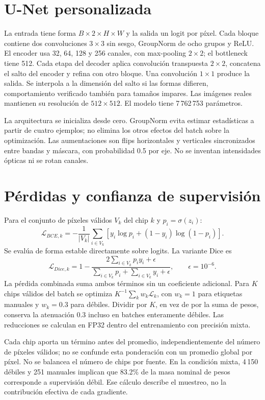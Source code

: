 \section{U-Net personalizada}
La entrada tiene forma $B\times2\times H\times W$ y la salida un logit por píxel.
Cada bloque contiene dos convoluciones $3\times3$ sin sesgo, GroupNorm de ocho grupos
y ReLU. El encoder usa 32, 64, 128 y 256 canales, con max-pooling $2\times2$;
el bottleneck tiene 512. Cada etapa del decoder aplica convolución transpuesta
$2\times2$, concatena el salto del encoder y refina con otro bloque. Una convolución
$1\times1$ produce la salida. Se interpola a la dimensión del salto si las formas
difieren, comportamiento verificado también para tamaños impares. Las imágenes reales
mantienen su resolución de $512\times512$. El modelo tiene 7\,762\,753 parámetros.

La arquitectura se inicializa desde cero. GroupNorm evita estimar estadísticas a partir de
cuatro ejemplos; no elimina los otros efectos del batch sobre la optimización. Las
aumentaciones son flips horizontales y verticales sincronizados entre bandas y máscara,
con probabilidad 0.5 por eje. No se inventan intensidades ópticas ni se rotan canales.

\section{Pérdidas y confianza de supervisión}
Para el conjunto de píxeles válidos $V_k$ del chip $k$ y $p_i=\sigma(z_i)$:
\begin{equation}
\mathcal{L}_{BCE,k}=-\frac{1}{|V_k|}\sum_{i\in V_k}
\left[y_i\log p_i+(1-y_i)\log(1-p_i)\right].
\end{equation}
Se evalúa de forma estable directamente sobre logits. La variante Dice es
\begin{equation}
\mathcal{L}_{Dice,k}=1-\frac{2\sum_{i\in V_k}p_i y_i+\epsilon}
{\sum_{i\in V_k}p_i+\sum_{i\in V_k}y_i+\epsilon},\qquad\epsilon=10^{-6}.
\end{equation}
La pérdida combinada suma ambos términos sin un coeficiente adicional. Para $K$ chips
válidos del batch se optimiza $K^{-1}\sum_k w_k\mathcal{L}_k$, con $w_k=1$ para
etiquetas manuales y $w_k=0.3$ para débiles. Dividir por $K$, en vez de por la suma de
pesos, conserva la atenuación 0.3 incluso en batches enteramente débiles.
Las reducciones se calculan en FP32 dentro del entrenamiento con precisión mixta.

Cada chip aporta un término antes del promedio, independientemente del número de píxeles
válidos; no se confunde esta ponderación con un promedio global por píxel. No se balancea
el número de chips por fuente. En la condición mixta, 4\,150 débiles y 251 manuales implican
que 83.2\% de la masa nominal de pesos corresponde a supervisión débil. Ese cálculo
describe el muestreo, no la contribución efectiva de cada gradiente.

